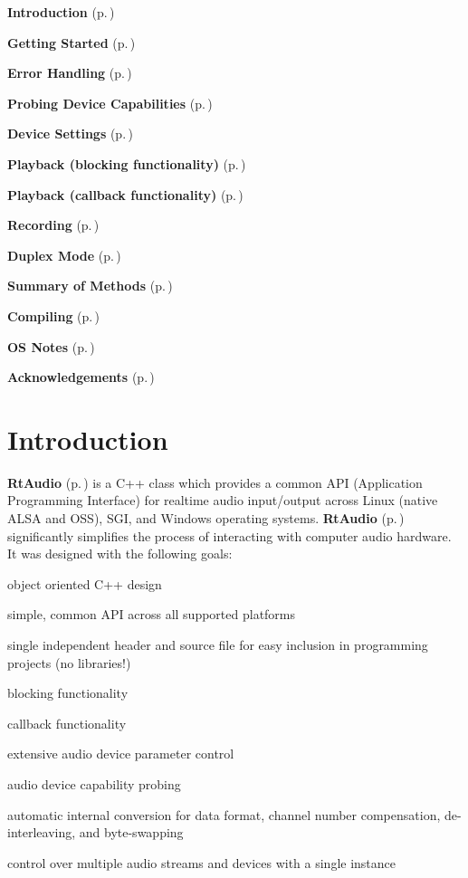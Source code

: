  

\begin{CompactItemize}
\item 
{\bf Introduction} {\rm (p.\,\pageref{intro})}\item 
{\bf Getting Started} {\rm (p.\,\pageref{start})}\item 
{\bf Error Handling} {\rm (p.\,\pageref{error})}\item 
{\bf Probing Device Capabilities} {\rm (p.\,\pageref{probing})}\item 
{\bf Device Settings} {\rm (p.\,\pageref{settings})}\item 
{\bf Playback (blocking functionality)} {\rm (p.\,\pageref{playbackb})}\item 
{\bf Playback (callback functionality)} {\rm (p.\,\pageref{playbackc})}\item 
{\bf Recording} {\rm (p.\,\pageref{recording})}\item 
{\bf Duplex Mode} {\rm (p.\,\pageref{duplex})}\item 
{\bf Summary of Methods} {\rm (p.\,\pageref{methods})}\item 
{\bf Compiling} {\rm (p.\,\pageref{compiling})}\item 
{\bf OS Notes} {\rm (p.\,\pageref{osnotes})}\item 
{\bf Acknowledgements} {\rm (p.\,\pageref{acknowledge})}\end{CompactItemize}
\section{Introduction}\label{intro}


{\bf Rt\-Audio} {\rm (p.\,\pageref{classRtAudio})} is a C++ class which provides a common API (Application Programming Interface) for realtime audio input/output across Linux (native ALSA and OSS), SGI, and Windows operating systems. {\bf Rt\-Audio} {\rm (p.\,\pageref{classRtAudio})} significantly simplifies the process of interacting with computer audio hardware. It was designed with the following goals:

\begin{CompactItemize}
 \item 
object oriented C++ design \item 
simple, common API across all supported platforms \item 
single independent header and source file for easy inclusion in programming projects (no libraries!) \item 
blocking functionality \item 
callback functionality \item 
extensive audio device parameter control \item 
audio device capability probing \item 
automatic internal conversion for data format, channel number compensation, de-interleaving, and byte-swapping \item 
control over multiple audio streams and devices with a single instance \end{CompactItemize}



